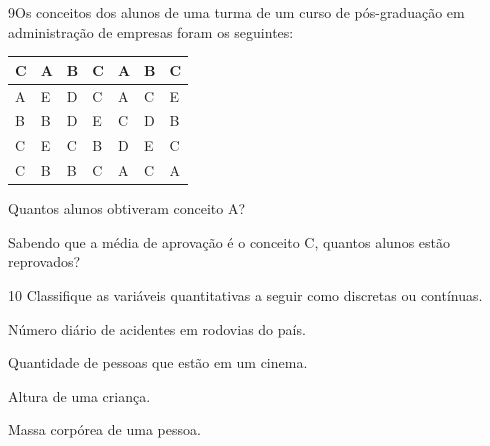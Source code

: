 \num{9}Os conceitos dos alunos de uma turma de um curso de pós-graduação
em administração de empresas foram os seguintes:

\begin{longtable}[]{@{}lllllll@{}}
\toprule
C & A & B & C & A & B & C\tabularnewline
\midrule
\endhead
A & E & D & C & A & C & E\tabularnewline
B & B & D & E & C & D & B\tabularnewline
C & E & C & B & D & E & C\tabularnewline
C & B & B & C & A & C & A\tabularnewline
\bottomrule
\end{longtable}

\begin{escolha}
\item
  Quantos alunos obtiveram conceito A?


\item
  Sabendo que a média de aprovação é o conceito C, quantos alunos estão
  reprovados?

\end{escolha}


\num{10} Classifique as variáveis quantitativas a seguir como discretas
ou contínuas.


\begin{escolha}
\item
  Número diário de acidentes em rodovias do país.


\item
  Quantidade de pessoas que estão em um cinema.


\item
  Altura de uma criança.


\item
  Massa corpórea de uma pessoa.

\end{escolha}


